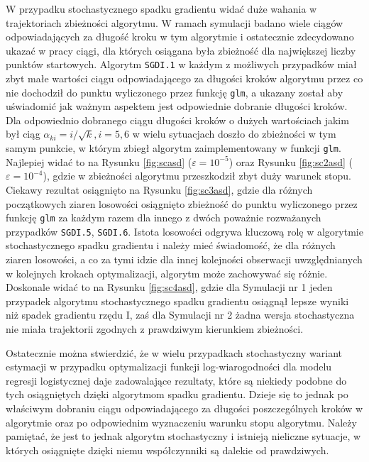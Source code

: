 W przypadku stochastycznego spadku gradientu widać duże wahania w trajektoriach zbieżności algorytmu. W ramach symulacji badano wiele ciągów odpowiadających za długość kroku w tym algorytmie i ostatecznie zdecydowano ukazać w pracy ciągi, dla których osiągana była zbieżność dla największej liczby punktów startowych. Algorytm \texttt{SGDI.1} w każdym z możliwych przypadków miał zbyt małe wartości ciągu odpowiadającego za długości kroków algorytmu przez co nie dochodził do punktu wyliczonego przez funkcję \texttt{glm}, a ukazany został aby uświadomić jak ważnym aspektem jest odpowiednie dobranie długości kroków. Dla odpowiednio dobranego ciągu długości kroków o dużych wartościach jakim był ciąg $\alpha_{ki} = i/\sqrt{k}, i = 5, 6$ w wielu sytuacjach doszło do zbieżności w tym samym punkcie, w którym zbiegł algorytm zaimplementowany w funkcji \texttt{glm}. Najlepiej widać to na Rysunku \ref{fig:scasd} ($\varepsilon = 10^{-5}$) oraz Rysunku \ref{fig:sc2asd} ($\varepsilon = 10^{-4}$), gdzie w zbieżności algorytmu przeszkodził zbyt duży warunek stopu. Ciekawy rezultat osiągnięto na Rysunku \ref{fig:sc3asd}, gdzie dla różnych początkowych ziaren losowości osiągnięto zbieżność do punktu wyliczonego przez funkcję \texttt{glm} za każdym razem dla innego z dwóch poważnie rozważanych przypadków \texttt{SGDI.5}, \texttt{SGDI.6}. Istota losowości odgrywa kluczową rolę w algorytmie stochastycznego spadku gradientu i należy mieć świadomość, że dla różnych ziaren losowości, a co za tymi idzie dla innej kolejności obserwacji uwzględnianych w kolejnych krokach optymalizacji, algorytm może zachowywać się różnie. Doskonale widać to na Rysunku \ref{fig:sc4asd}, gdzie dla Symulacji nr 1 jeden przypadek algorytmu stochastycznego spadku gradientu osiągnął lepsze wyniki niż spadek gradientu rzędu I, zaś dla Symulacji nr 2 żadna wersja stochastyczna nie miała trajektorii zgodnych z prawdziwym kierunkiem zbieżności.

Ostatecznie można stwierdzić, że w wielu przypadkach stochastyczny wariant estymacji w przypadku optymalizacji funkcji log-wiarogodności dla modelu regresji logistycznej daje zadowalające rezultaty, które są niekiedy podobne do tych osiągniętych dzięki algorytmom spadku gradientu. Dzieje się to jednak po właściwym dobraniu ciągu odpowiadającego za długości poszczególnych kroków w algorytmie oraz po odpowiednim wyznaczeniu warunku stopu algorytmu. Należy pamiętać, że jest to jednak algorytm stochastyczny i istnieją nieliczne sytuacje, w których osiągnięte dzięki niemu współczynniki są dalekie od prawdziwych.



